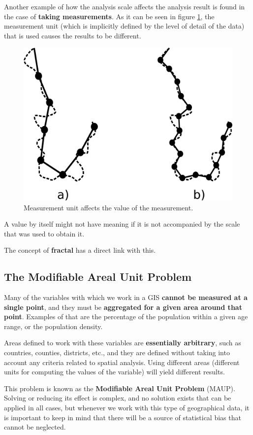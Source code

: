 Another example of how the analysis scale affects the analysis result is found in the case of \textbf{taking measurements}. As it can be seen in figure \ref{Fig:Fractal_line}, the measurement unit (which is implicitly defined by the level of detail of the data) that is used causes the results to be different. 

\begin{figure}[h]   
\centering
\includegraphics[width= .45\columnwidth]{Analysis/Fractal_line.pdf}
\caption{\small Measurement unit affects the value of the measurement.}
\label{Fig:Fractal_line} 
\end{figure}

A value by itself might not have meaning if it is not accompanied by the scale that was used to obtain it.

The concept of \textbf{fractal} has a direct link with this.


\subsection{The Modifiable Areal Unit Problem}


Many of the variables with which we work in a GIS \textbf{cannot be measured at a single point}, and they must be \textbf{aggregated for a given area around that point}. Examples of that are the percentage of the population within a given age range, or the population density. 

Areas defined to work with these variables are \textbf{essentially arbitrary}, such as countries, counties, districts, etc., and they are defined without taking into account any criteria related to spatial analysis. Using different areas (different units for computing the values of the variable) will yield different results.

This problem is known as the \textbf{Modifiable Areal Unit Problem} (MAUP). Solving or reducing its effect is complex, and no solution exists that can be applied in all cases, but whenever we work with this type of geographical data, it is important to keep in mind that there will be a source of statistical bias that cannot be neglected.


